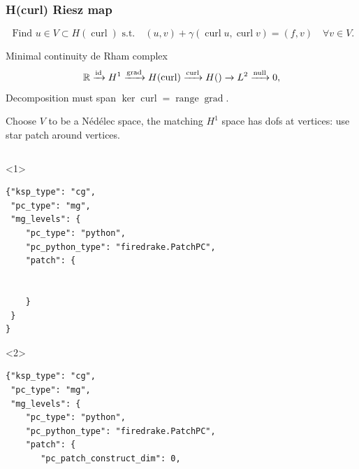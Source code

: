\documentclass[presentation,aspectratio=43,10pt]{beamer}
\DeclareMathOperator{\grad}{grad}
\let\div\relax
\DeclareMathOperator{\div}{div}
\DeclareMathOperator{\curl}{curl}
\DeclareMathOperator{\range}{range}
\begin{document}
\begin{frame}[fragile]
  \frametitle{H(curl) Riesz map}
  \vspace{-1.5\baselineskip}
  \begin{equation*}
    \text{  Find $u \in V \subset H(\curl)$ s.t.} \quad (u, v) + \gamma (\curl u, \curl v) = (f, v) \quad \forall v \in V.
  \end{equation*}
  \vspace{-\baselineskip}
  \begin{block}{Minimal continuity de Rham complex}
    \begin{equation*}
      \mathbb{R} \xrightarrow{\operatorname{id}} H^1 \xrightarrow{\grad} H(\curl)
      \xrightarrow{\curl} H(\div) \xrightarrow{\div} L^2 \xrightarrow{\operatorname{null}} 0,
    \end{equation*}
    Decomposition must span $\ker \curl = \range \grad$.

    Choose $V$ to be a N\'ed\'elec space, the matching $H^1$
    space has dofs at vertices: use star patch around vertices.
  \end{block}
  \begin{columns}
    \begin{column}{0.6\textwidth}
      \begin{onlyenv}<1>
\begin{verbatim}
{"ksp_type": "cg",
 "pc_type": "mg",
 "mg_levels": {
    "pc_type": "python",
    "pc_python_type": "firedrake.PatchPC",
    "patch": {


    }
 }
}
\end{verbatim}
      \end{onlyenv}
      \begin{onlyenv}<2>
\begin{verbatim}
{"ksp_type": "cg",
 "pc_type": "mg",
 "mg_levels": {
    "pc_type": "python",
    "pc_python_type": "firedrake.PatchPC",
    "patch": {
       "pc_patch_construct_dim": 0,


\end{verbatim}
\end{onlyenv}
\end{column}
\end{columns}
\end{frame}
\end{document}
